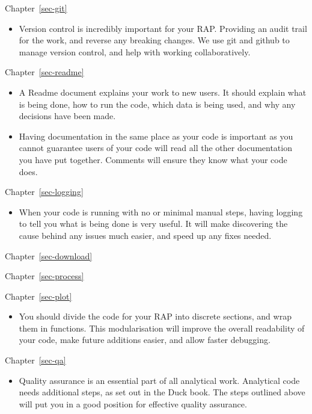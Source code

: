 \documentclass[
  letterpaper,
]{book}
\providecommand{\tightlist}{%
  \setlength{\itemsep}{0pt}\setlength{\parskip}{0pt}}\usepackage{longtable,booktabs,array}
\begin{document}
Chapter~\ref{sec-git}

\begin{itemize}
\tightlist
\item
  Version control is incredibly important for your RAP. Providing an
  audit trail for the work, and reverse any breaking changes. We use git
  and github to manage version control, and help with working
  collaboratively.
\end{itemize}

Chapter~\ref{sec-readme}

\begin{itemize}
\tightlist
\item
  A Readme document explains your work to new users. It should explain
  what is being done, how to run the code, which data is being used, and
  why any decisions have been made.
\item
  Having documentation in the same place as your code is important as
  you cannot guarantee users of your code will read all the other
  documentation you have put together. Comments will ensure they know
  what your code does.
\end{itemize}

Chapter~\ref{sec-logging}

\begin{itemize}
\tightlist
\item
  When your code is running with no or minimal manual steps, having
  logging to tell you what is being done is very useful. It will make
  discovering the cause behind any issues much easier, and speed up any
  fixes needed.
\end{itemize}

Chapter~\ref{sec-download}

Chapter~\ref{sec-process}

Chapter~\ref{sec-plot}

\begin{itemize}
\tightlist
\item
  You should divide the code for your RAP into discrete sections, and
  wrap them in functions. This modularisation will improve the overall
  readability of your code, make future additions easier, and allow
  faster debugging.
\end{itemize}

Chapter~\ref{sec-qa}

\begin{itemize}
\tightlist
\item
  Quality assurance is an essential part of all analytical work.
  Analytical code needs additional steps, as set out in the Duck book.
  The steps outlined above will put you in a good position for effective
  quality assurance.
\end{itemize}
\end{document}
